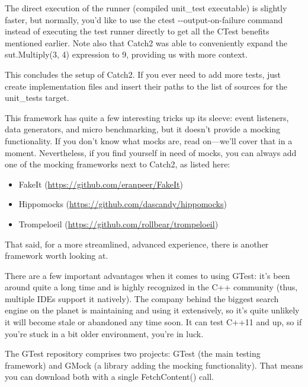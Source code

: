 The direct execution of the runner (compiled unit\_test executable) is slightly faster, but normally, you'd like to use the ctest -{}-output-on-failure command instead of executing the test runner directly to get all the CTest benefits mentioned earlier. Note also that Catch2 was able to conveniently expand the sut.Multiply(3, 4) expression to 9, providing us with more context.

This concludes the setup of Catch2. If you ever need to add more tests, just create implementation files and insert their paths to the list of sources for the unit\_tests target.

This framework has quite a few interesting tricks up its sleeve: event listeners, data generators, and micro benchmarking, but it doesn't provide a mocking functionality. If you don't know what mocks are, read on—we'll cover that in a moment. Nevertheless, if you find yourself in need of mocks, you can always add one of the mocking frameworks next to Catch2, as listed here:

\begin{itemize}
\item 
FakeIt (\url{https://github.com/eranpeer/FakeIt})

\item 
Hippomocks (\url{https://github.com/dascandy/hippomocks})

\item 
Trompeloeil (\url{https://github.com/rollbear/trompeloeil})
\end{itemize}

That said, for a more streamlined, advanced experience, there is another framework worth looking at.


There are a few important advantages when it comes to using GTest: it's been around quite a long time and is highly recognized in the C++ community (thus, multiple IDEs support it natively). The company behind the biggest search engine on the planet is maintaining and using it extensively, so it's quite unlikely it will become stale or abandoned any time soon. It can test C++11 and up, so if you're stuck in a bit older environment, you're in luck.

The GTest repository comprises two projects: GTest (the main testing framework) and GMock (a library adding the mocking functionality). That means you can download both with a single FetchContent() call.

